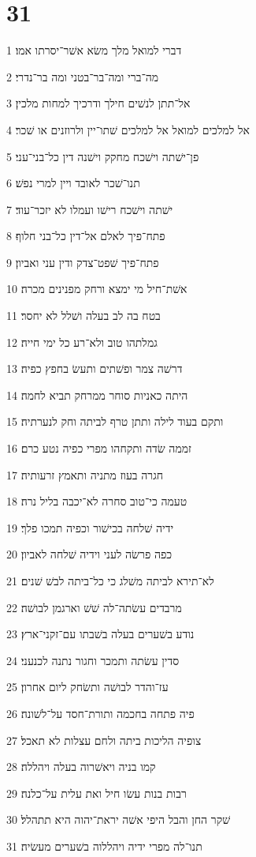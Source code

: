 \chapter{31}

\par 1 דברי למואל מלך משׂא אשׁר־יסרתו אמו׃
\par 2 מה־ברי ומה־בר־בטני ומה בר־נדרי׃
\par 3 אל־תתן לנשׁים חילך ודרכיך למחות מלכין׃
\par 4 אל למלכים למואל אל למלכים שׁתו־יין ולרוזנים או שׁכר׃
\par 5 פן־ישׁתה וישׁכח מחקק וישׁנה דין כל־בני־עני׃
\par 6 תנו־שׁכר לאובד ויין למרי נפשׁ׃
\par 7 ישׁתה וישׁכח רישׁו ועמלו לא יזכר־עוד׃
\par 8 פתח־פיך לאלם אל־דין כל־בני חלוף׃
\par 9 פתח־פיך שׁפט־צדק ודין עני ואביון׃
\par 10 אשׁת־חיל מי ימצא ורחק מפנינים מכרה׃
\par 11 בטח בה לב בעלה ושׁלל לא יחסר׃
\par 12 גמלתהו טוב ולא־רע כל ימי חייה׃
\par 13 דרשׁה צמר ופשׁתים ותעשׂ בחפץ כפיה׃
\par 14 היתה כאניות סוחר ממרחק תביא לחמה׃
\par 15 ותקם בעוד לילה ותתן טרף לביתה וחק לנערתיה׃
\par 16 זממה שׂדה ותקחהו מפרי כפיה נטע כרם׃
\par 17 חגרה בעוז מתניה ותאמץ זרעותיה׃
\par 18 טעמה כי־טוב סחרה לא־יכבה בליל נרה׃
\par 19 ידיה שׁלחה בכישׁור וכפיה תמכו פלך׃
\par 20 כפה פרשׂה לעני וידיה שׁלחה לאביון׃
\par 21 לא־תירא לביתה משׁלג כי כל־ביתה לבשׁ שׁנים׃
\par 22 מרבדים עשׂתה־לה שׁשׁ וארגמן לבושׁה׃
\par 23 נודע בשׁערים בעלה בשׁבתו עם־זקני־ארץ׃
\par 24 סדין עשׂתה ותמכר וחגור נתנה לכנעני׃
\par 25 עז־והדר לבושׁה ותשׂחק ליום אחרון׃
\par 26 פיה פתחה בחכמה ותורת־חסד על־לשׁונה׃
\par 27 צופיה הליכות ביתה ולחם עצלות לא תאכל׃
\par 28 קמו בניה ויאשׁרוה בעלה ויהללה׃
\par 29 רבות בנות עשׂו חיל ואת עלית על־כלנה׃
\par 30 שׁקר החן והבל היפי אשׁה יראת־יהוה היא תתהלל׃
\par 31 תנו־לה מפרי ידיה ויהללוה בשׁערים מעשׂיה׃


